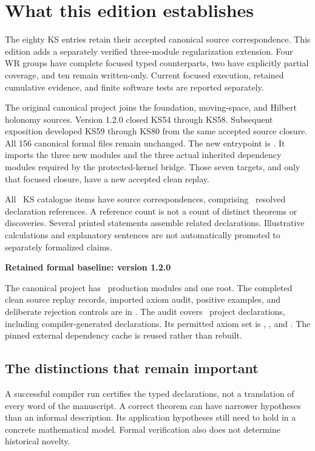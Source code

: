 \documentclass[11pt]{article}
\begin{document}
\KomorebiCover
\section*{What this edition establishes}
The eighty KS entries retain their accepted canonical source correspondence. This edition adds a separately verified three-module regularization extension. Four WR groups have complete focused typed counterparts, two have explicitly partial coverage, and ten remain written-only. Current focused execution, retained cumulative evidence, and finite software tests are reported separately.

The original canonical project joins the foundation, moving-space, and Hilbert holonomy sources. Version 1.2.0 closed KS54 through KS58. Subsequent exposition developed KS59 through KS80 from the same accepted source closure. All 156 canonical formal files remain unchanged. The new entrypoint is . It imports the three new modules and the three actual inherited dependency modules required by the protected-kernel bridge. Those seven targets, and only that focused closure, have a new accepted clean replay.

All \EditionClaims\ KS catalogue items have source correspondences, comprising \EditionReferences\ resolved declaration references. A reference count is not a count of distinct theorems or discoveries. Several printed statements assemble related declarations. Illustrative calculations and explanatory sentences are not automatically promoted to separately formalized claims.

\begin{scopebox}
\textbf{Retained formal baseline: version 1.2.0}\par
The canonical project has \EditionFormalModules\ production modules and one root. The completed clean source replay records, imported axiom audit, positive examples, and deliberate rejection controls are in . The audit covers \EditionAuditedDeclarations\ project declarations, including compiler-generated declarations. Its permitted axiom set is , , and . The pinned external dependency cache is reused rather than rebuilt.
\end{scopebox}

\subsection*{The distinctions that remain important}
A successful compiler run certifies the typed declarations, not a translation of every word of the manuscript. A correct theorem can have narrower hypotheses than an informal description. Its application hypotheses still need to hold in a concrete mathematical model. Formal verification also does not determine historical novelty.
\end{document}
